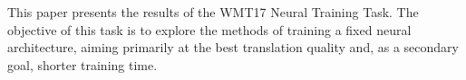 This paper presents the results of the WMT17 Neural Training Task. The objective of this task is to explore the methods of training a fixed neural architecture, aiming primarily at the best translation quality and, as a secondary goal, shorter training time.
